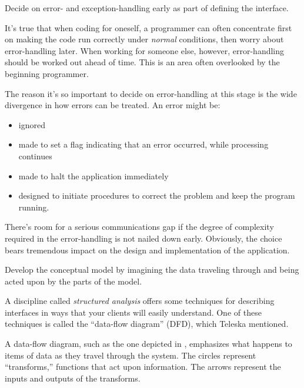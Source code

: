 \begin{tip}
Decide on error- and exception-handling early as part of defining the
interface.
\end{tip}

\noindent It's true that when coding for oneself, a programmer can
often concentrate first on making the code run correctly under
\emph{normal} conditions, then worry about error-handling later. When
working for someone else, however, error-handling should be worked out
ahead of time. This is an area often overlooked by the beginning
programmer.

The reason it's so important to decide on error-handling at this stage
is the wide divergence in how errors can be treated. An error might be:

\begin{itemize}
\item ignored
\item made to set a flag indicating that an error occurred, while
processing continues
\item made to halt the application immediately
\item designed to initiate procedures to correct the problem and keep
the program running.
\end{itemize}


There's room for a serious communications gap if the degree of
complexity required in the error-handling is not nailed down early.
Obviously, the choice bears tremendous impact on the design and
implementation of the application.

\begin{tip}
Develop the conceptual model by imagining the data traveling through and
being acted upon by the parts of the model.
\end{tip}
A discipline called \emph{structured analysis} \cite{weinberg80}
offers some techniques for describing interfaces in ways that your
clients will easily understand.  One of these techniques is called the
``data-flow diagram'' (DFD), which Teleska mentioned.


A data-flow diagram, such as the one depicted in ,
emphasizes what happens to items of data as they travel through the
system.  The circles represent ``transforms,'' functions that act upon
information.  The arrows represent the inputs and outputs of the
transforms.

